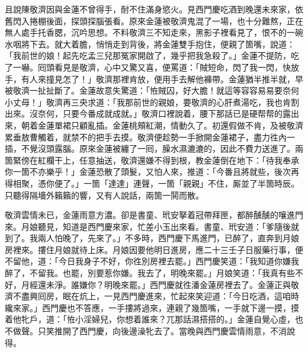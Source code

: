 且說陳敬濟因與金蓮不曾得手，耐不住滿身慾火。見西門慶吃酒到晚還未來家，依舊閃入捲棚後面，探頭探腦張看。原來金蓮被敬濟鬼混了一場，也十分難熬，正在無人處手托香腮，沉吟思想。不料敬濟三不知走來，黑影子裡看見了，恨不的一碗水咽將下去。就大着膽，悄悄走到背後，將金蓮雙手抱住，便親了箇嘴，說道：「我前世的娘！起先吃孟三兒那冤家開啟了，幾乎把我急殺了。」金蓮不提防，吃了一嚇。囘頭看見是敬濟，心中又驚又喜，便罵道：{}「賊短命，閃了我一閃，快放手，有人來撞見怎了！」敬濟那裡肯放，便用手去解他褲帶。金蓮猶半推半就，早被敬濟一扯扯斷了。金蓮故意失驚道：「恠賊囚，好大膽！就這等容容易易要奈何小丈母！」{}敬濟再三央求道：「我那前世的親娘，要敬濟的心肝煮湯吃，我也肯割出來。沒奈何，只要今番成就成就。」敬濟口裡說着，腰下那話已是硬帮帮的露出來，朝着金蓮單裙只顧亂插。金蓮桃頰紅潮，情動久了。初還假做不肯，{}及被敬濟累垂敖曹觸着，就禁不的把手去摸。{}敬濟便趁勢一手掀開金蓮裙子，盡力徃內一插，不覺沒頭露腦。原來金蓮被纏了一囘，臊水濕漉漉的，因此不費力送進了。兩箇緊傍在紅欄干上，任意抽送，敬濟還嫌不得到根，教金蓮倒在地下：「待我奉承你一箇不亦樂乎！」金蓮恐散了頭髮，又怕人來，{}推道：「今番且將就些，後次再得相聚，憑你便了。」{}一箇「達達」連聲，一箇「親親」不住，厮並了半箇時辰。只聽得隔墻外籟籟的響，又有人說話，兩箇一鬨而散。

敬濟雲情未已，金蓮雨意方濃。卻是書童、玳安拏着冠帶拜匣，都醉醺醺的嚷進門來。月娘聽見，知道是西門慶來家，忙差小玉出來看。書童、玳安道：「爹隨後就到了。我兩人怕晚了，先來了。」不多時，西門慶下馬進門，已醉了，直奔到月娘房裡來。摟住月娘就待上床。月娘因要他明日進房，應二十三壬子日服藥行事，便不留他，道：「今日我身子不好，你徃別房裡去罷。」西門慶笑道：「我知道你嫌我醉了，不留我。也罷，別要惹你嫌。我去了，明晚來罷。」{}月娘笑道：「我真有些不好，月經還未淨。誰嫌你？明晚來罷。」西門慶就徃潘金蓮房裡去了。金蓮正與敬濟不盡興囘房，眠在炕上，一見西門慶進來，忙起來笑迎道：「今日吃酒，這咱時纔來家。」西門慶也不答應，一手摟將過來，連親了幾箇嘴，一手就下邊一摸，摸着他牝戶，道：「恠小淫婦兒，你想着誰來？兀那話濕搭搭的。」{}金蓮自覺心虛，也不做聲。{}只笑推開了西門慶，向後邊澡牝去了。當晚與西門慶雲情雨意，不消說得。

